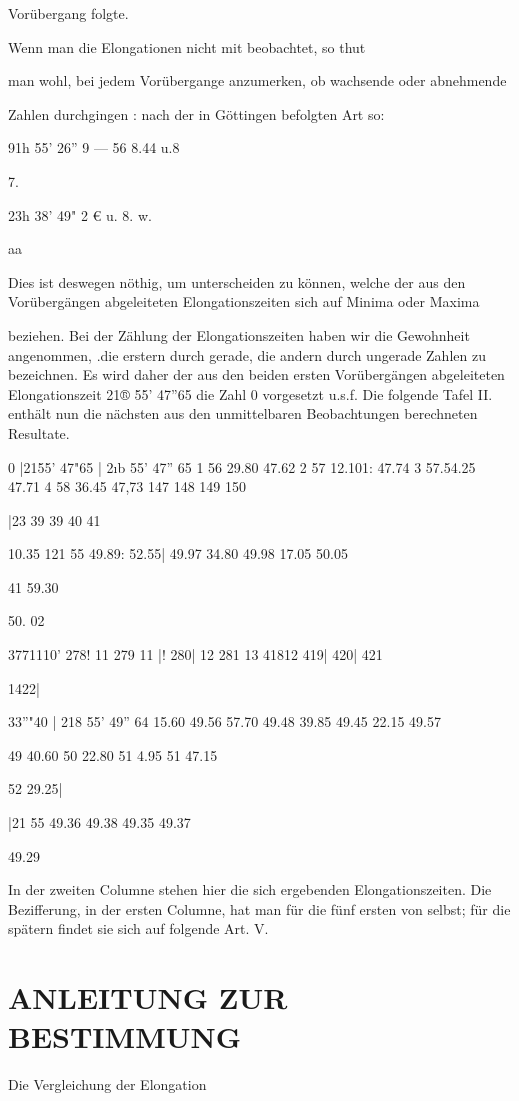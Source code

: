 \documentclass[12pt,a4paper]{article}
\begin{document}
Vorübergang folgte.

Wenn man die Elongationen nicht mit beobachtet, so thut

man wohl, bei jedem Vorübergange anzumerken, ob wachsende oder abnehmende

Zahlen durchgingen : nach der in Göttingen befolgten Art so:

91h 55’ 26” 9 — 56 8.44 u.8

7.

23h 38’ 49" 2 € u. 8. w.

aa

Dies ist deswegen nöthig, um unterscheiden zu können, welche der aus den Vorübergängen abgeleiteten Elongationszeiten sich auf Minima oder Maxima

beziehen. Bei der Zählung der Elongationszeiten haben wir die Gewohnheit angenommen, .die erstern durch gerade, die andern durch ungerade Zahlen zu bezeichnen. Es wird daher der aus den beiden ersten Vorübergängen abgeleiteten Elongationszeit 21® 55’ 47”65 die Zahl 0 vorgesetzt u.s.f. Die folgende Tafel II. enthält nun die nächsten aus den unmittelbaren Beobachtungen berechneten Resultate.

0 |2155’ 47"65 | 2ıb 55’ 47” 65 1 56 29.80 47.62 2 57 12.101: 47.74 3 57.54.25 47.71 4 58 36.45 47,73 147 148 149 150

|23 39 39 40 41

10.35 121 55 49.89: 52.55| 49.97 34.80 49.98 17.05 50.05

41 59.30

50. 02

3771110’ 278! 11 279 11 |! 280| 12 281 13 41812 419| 420| 421

1422|

33”"40 | 218 55’ 49” 64 15.60 49.56 57.70 49.48 39.85 49.45 22.15 49.57

49 40.60 50 22.80 51 4.95 51 47.15

52 29.25|

|21 55 49.36 49.38 49.35 49.37

49.29

In der zweiten Columne stehen hier die sich ergebenden Elongationszeiten. Die Bezifferung, in der ersten Columne, hat man für die fünf ersten von selbst; für die spätern findet sie sich auf folgende Art. V.

\section*{ANLEITUNG ZUR BESTIMMUNG}
Die Vergleichung der Elongation
\end{document}
